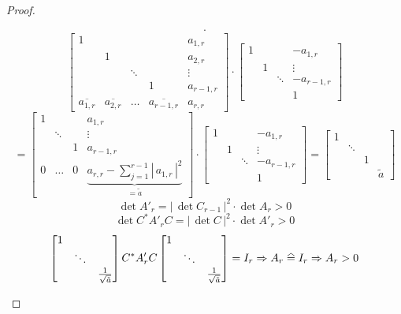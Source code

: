 \documentclass[a4paper,landscape,twocolumn]{article}
\newcommand\abs[1]{|\,#1\,|}
\newcommand\equalhat{\mathrel{\stackon[1.5pt]{=}{\stretchto{%
    \scalerel*[\widthof{=}]{\wedge}{\rule{1ex}{3ex}}}{0.5ex}}}}
\theoremstyle{definition}
\begin{document}
\begin{proof}
\begin{description}
\[        \cdot
      \] \[
        \begin{bmatrix}
          1 &   &        &   & a_{1,r} \\
            & 1 &        &   & a_{2,r} \\
            &   & \ddots &   & \vdots \\
            &   &        & 1 & a_{r-1,r} \\
          \overline{a_{1,r}} & \overline{a_{2,r}} & \ldots & \overline{a_{r-1,r}} & a_{r,r}
        \end{bmatrix}
        \cdot
        \begin{bmatrix}
          1 &   &        & -a_{1,r} \\
            & 1 &        & \vdots \\
            &   & \ddots & -a_{r-1,r} \\
            &   &        & 1
        \end{bmatrix}
      \] \[
        =
        \begin{bmatrix}
          1 &        &   & a_{1,r} \\
            & \ddots &   & \vdots \\
            &        & 1 & a_{r-1,r} \\
          0 & \ldots & 0 & \underbrace{a_{r,r} - \sum_{j=1}^{r-1} \abs{a_{1,r}}^2}_{= \tilde{a}}
        \end{bmatrix}
        \cdot
        \begin{bmatrix}
          1 &   &        & -a_{1,r} \\
            & 1 &        & \vdots \\
            &   & \ddots & -a_{r-1,r} \\
            &   &        & 1
        \end{bmatrix}
        = \begin{bmatrix}
          1 &        &   &           \\
            & \ddots &   &           \\
            &        & 1 &           \\
            &        &   & \tilde{a}
        \end{bmatrix}
      \] \[
        \det{A'_r} = \abs{\det{C_{r-1}}}^2 \cdot \det{A_r} > 0
      \] \[
        \det{C^* A'_r C} = \abs{\det{C}}^2 \cdot \det{A'_r} > 0
      \] \[
        \begin{bmatrix}
          1 &        & \\
            & \ddots & \\
            &        & \frac{1}{\sqrt{\tilde{a}}}
        \end{bmatrix}
        C^* A'_r C
        \begin{bmatrix}
          1 &        & \\
            & \ddots & \\
            &        & \frac{1}{\sqrt{\tilde{a}}}
        \end{bmatrix}
        = I_r
        \Rightarrow A_r \equalhat I_r \Rightarrow A_r > 0
      \]
  \end{description}
\end{proof}
\end{document}
